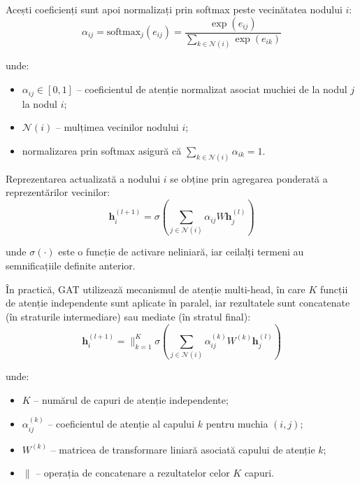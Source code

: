 \documentclass[12pt,a4paper]{report}
\theoremstyle{definition}
\theoremstyle{remark}
\begin{document}
Acești coeficienți sunt apoi normalizați prin softmax peste vecinătatea nodului $i$:
\begin{equation}
    \alpha_{ij} = \text{softmax}_j(e_{ij}) = \frac{\exp(e_{ij})}{\sum_{k \in \mathcal{N}(i)} \exp(e_{ik})}
    \label{eq:gat_softmax}
\end{equation}

\noindent unde:
\begin{itemize}
    \item $\alpha_{ij} \in [0, 1]$ -- coeficientul de atenție normalizat asociat muchiei de la nodul $j$ la nodul $i$;
    \item $\mathcal{N}(i)$ -- mulțimea vecinilor nodului $i$;
    \item normalizarea prin softmax asigură că $\sum_{k \in \mathcal{N}(i)} \alpha_{ik} = 1$.
\end{itemize}

Reprezentarea actualizată a nodului $i$ se obține prin agregarea ponderată a reprezentărilor vecinilor:
\begin{equation}
    \mathbf{h}_i^{(l+1)} = \sigma\left(\sum_{j \in \mathcal{N}(i)} \alpha_{ij} W \mathbf{h}_j^{(l)}\right)
    \label{eq:gat_update}
\end{equation}

\noindent unde $\sigma(\cdot)$ este o funcție de activare neliniară, iar ceilalți termeni au semnificațiile definite anterior.

În practică, GAT utilizează mecanismul de atenție multi-head, în care $K$ funcții de atenție independente sunt aplicate în paralel, iar rezultatele sunt concatenate (în straturile intermediare) sau mediate (în stratul final):
\begin{equation}
    \mathbf{h}_i^{(l+1)} = \Big\|_{k=1}^{K} \sigma\left(\sum_{j \in \mathcal{N}(i)} \alpha_{ij}^{(k)} W^{(k)} \mathbf{h}_j^{(l)}\right)
    \label{eq:gat_multihead}
\end{equation}

\noindent unde:
\begin{itemize}
    \item $K$ -- numărul de capuri de atenție independente;
    \item $\alpha_{ij}^{(k)}$ -- coeficientul de atenție al capului $k$ pentru muchia $(i, j)$;
    \item $W^{(k)}$ -- matricea de transformare liniară asociată capului de atenție $k$;
    \item $\|$ -- operația de concatenare a rezultatelor celor $K$ capuri.
\end{itemize}
\end{document}
